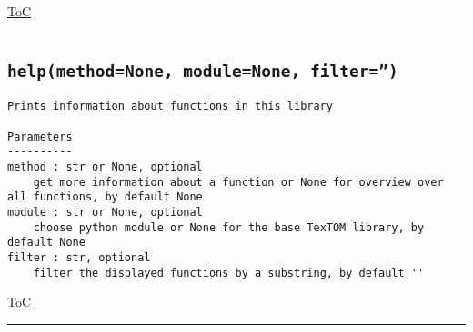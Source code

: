 \documentclass{article}
\begin{document}
\begin{flushright}

\hyperref[toc]{ToC}

\end{flushright}



\vspace{5mm}

\hrule

\subsection*{\texttt{help(method=None, module=None, filter='')}}

\begin{lstlisting}[language=docstring]
Prints information about functions in this library

Parameters
----------
method : str or None, optional
    get more information about a function or None for overview over all functions, by default None
module : str or None, optional
    choose python module or None for the base TexTOM library, by default None
filter : str, optional
    filter the displayed functions by a substring, by default ''
\end{lstlisting}

\begin{flushright}

\hyperref[toc]{ToC}

\end{flushright}



\vspace{5mm}

\hrule
\end{document}
